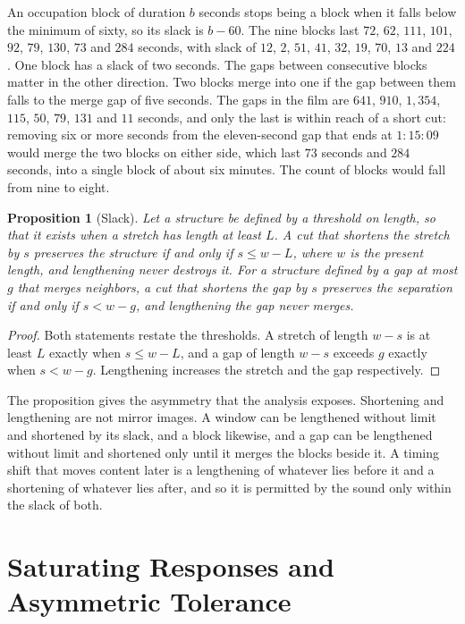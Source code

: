 \documentclass[11pt,twoside,openright]{book}
\theoremstyle{plain}
\newtheorem{proposition}[theorem]{Proposition}
\theoremstyle{definition}
\theoremstyle{remark}
\begin{document}
An occupation block of duration $b$ seconds stops being a block when it falls below the minimum of sixty, so its slack is $b-60$. The nine blocks last $72$, $62$, $111$, $101$, $92$, $79$, $130$, $73$ and $284$ seconds, with slack of $12$, $2$, $51$, $41$, $32$, $19$, $70$, $13$ and $224$. One block has a slack of two seconds. The gaps between consecutive blocks matter in the other direction. Two blocks merge into one if the gap between them falls to the merge gap of five seconds. The gaps in the film are $641$, $910$, $1{,}354$, $115$, $50$, $79$, $131$ and $11$ seconds, and only the last is within reach of a short cut: removing six or more seconds from the eleven-second gap that ends at $1{:}15{:}09$ would merge the two blocks on either side, which last $73$ seconds and $284$ seconds, into a single block of about six minutes. The count of blocks would fall from nine to eight.

\begin{proposition}[Slack]\label{prop:slack}
Let a structure be defined by a threshold on length, so that it exists when a stretch has length at least $L$. A cut that shortens the stretch by $s$ preserves the structure if and only if $s\le w-L$, where $w$ is the present length, and lengthening never destroys it. For a structure defined by a gap at most $g$ that merges neighbors, a cut that shortens the gap by $s$ preserves the separation if and only if $s<w-g$, and lengthening the gap never merges.
\end{proposition}

\begin{proof}
Both statements restate the thresholds. A stretch of length $w-s$ is at least $L$ exactly when $s\le w-L$, and a gap of length $w-s$ exceeds $g$ exactly when $s<w-g$. Lengthening increases the stretch and the gap respectively.
\end{proof}

The proposition gives the asymmetry that the analysis exposes. Shortening and lengthening are not mirror images. A window can be lengthened without limit and shortened by its slack, and a block likewise, and a gap can be lengthened without limit and shortened only until it merges the blocks beside it. A timing shift that moves content later is a lengthening of whatever lies before it and a shortening of whatever lies after, and so it is permitted by the sound only within the slack of both.

\section{Saturating Responses and Asymmetric Tolerance}\label{sec:saturating}
\end{document}

